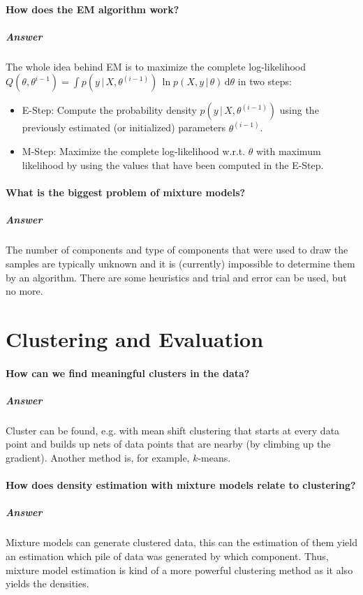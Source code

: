 \documentclass[a4paper, 11pt, accentcolor = tud3b]{tudreport}
\newcommand{\answer}[1]{\subparagraph{Answer} #1}
\newcommand{\given}{\ensuremath{\,\vert\,}}
\newcommand{\dif}[1]{\ensuremath{\,\mathrm{d}#1}}
\begin{document}
			\paragraph{How does the EM algorithm work?}
			\answer{
				The whole idea behind EM is to maximize the complete log-likelihood \( Q(\theta, \theta^{i - 1}) = \int p(y \given X, \theta^{(i - 1)}) \, \ln p(X, y \given \theta) \dif{\theta} \) in two steps:
				\begin{itemize}
					\item E-Step: Compute the probability density \( p(y \given X, \theta^{(i - 1)}) \) using the previously estimated (or initialized) parameters \( \theta^{(i - 1)} \).
					\item M-Step: Maximize the complete log-likelihood w.r.t. \( \theta \) with maximum likelihood by using the values that have been computed in the E-Step.
				\end{itemize}
			}

			\paragraph{What is the biggest problem of mixture models?}
			\answer{The number of components and type of components that were used to draw the samples are typically unknown and it is (currently) impossible to determine them by an algorithm. There are some heuristics and trial and error can be used, but no more.}

		\section{Clustering and Evaluation}
			\paragraph{How can we find meaningful clusters in the data?}
			\answer{Cluster can be found, e.g. with mean shift clustering that starts at every data point and builds up nets of data points that are nearby (by climbing up the gradient). Another method is, for example, \(k\)-means.}

			\paragraph{How does density estimation with mixture models relate to clustering?} %
			\answer{Mixture models can generate clustered data, this can the estimation of them yield an estimation which pile of data was generated by which component. Thus, mixture model estimation is kind of a more powerful clustering method as it also yields the densities.}
\end{document}
